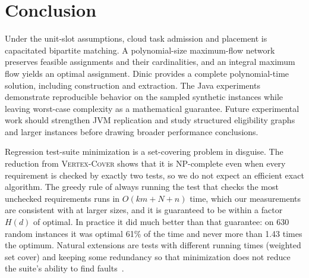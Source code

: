 \documentclass[conference]{IEEEtran}
\theoremstyle{definition}
\theoremstyle{remark}
\newcommand{\VC}{\textsc{Vertex-Cover}}
\begin{document}
\section{Conclusion}
Under the unit-slot assumptions, cloud task admission and placement is
capacitated bipartite matching. A polynomial-size maximum-flow network
preserves feasible assignments and their cardinalities, and an integral
maximum flow yields an optimal assignment. Dinic provides a complete
polynomial-time solution, including construction and extraction. The Java
experiments demonstrate reproducible behavior on the sampled synthetic
instances while leaving worst-case complexity as a mathematical guarantee.
Future experimental work should strengthen JVM replication and study
structured eligibility graphs and larger instances before drawing broader
performance conclusions.

Regression test-suite minimization is a set-covering problem in disguise. The
reduction from \VC{} shows that it is NP-complete even when every requirement is
checked by exactly two tests, so we do not expect an efficient exact algorithm.
The greedy rule of always running the test that checks the most unchecked
requirements runs in $O(km + N + n)$ time, which our measurements are
consistent with at larger sizes, and it is guaranteed to be within a factor
$H(d)$ of optimal.
In practice it did much better than that guarantee: on 630 random instances it
was optimal 61\% of the time and never more than 1.43 times the optimum.
Natural extensions are tests with different running times (weighted set cover)
and keeping some redundancy so that minimization does not reduce the suite's
ability to find faults~\cite{rothermel1998}.
\end{document}
